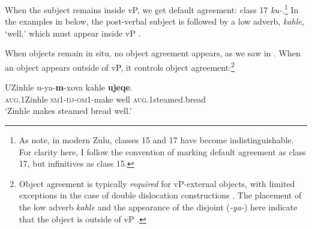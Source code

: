 \documentclass[output=paper,colorlinks,citecolor=brown]{langscibook}
\begin{document}
\ea%
    \label{ex:halpert:2}
\z 
\z 

When the subject remains inside vP, we get default agreement: class 17 \textit{ku-}.\footnote{As \citet{BuellDreu2013} note, in modern Zulu, classes 15 and 17 have become indistinguishable. For clarity here, I follow the convention of marking default agreement as class 17, but infinitives as class 15.}  In the examples in  below, the post-verbal subject is followed by a low adverb, \textit{kahle}, `well,' which must appear inside vP \citep{Buell2005}.

\ea%
    \label{ex:halpert:3}
    \z 
\z 

When objects remain in situ, no object agreement appears, as we saw in . When an object appears outside of vP, it controls object agreement:\footnote{Object agreement is typically \textit{required} for vP-external objects, with limited exceptions in the case of double dislocation constructions \cite[e.g.][]{Adams2010,Zeller2012}.  The placement of the low adverb \textit{kahle} and the appearance of the  disjoint  (\textit{-ya-}) here indicate that the object is outside of vP \citep{Buell2005,Halpert2015}.}

\ea%
    \label{ex:halpert:4}
    \gll    UZinhle u-ya-\textbf{m}-xova kahle  \textbf{ujeqe}.\\
            \textsc{aug}.1Zinhle \textsc{sm}1-\textsc{dj}-\textsc{om}1-make well  \textsc{aug}.1steamed.bread\\ 
    \glt    `Zinhle makes steamed bread well.'
\z 
\end{document}
